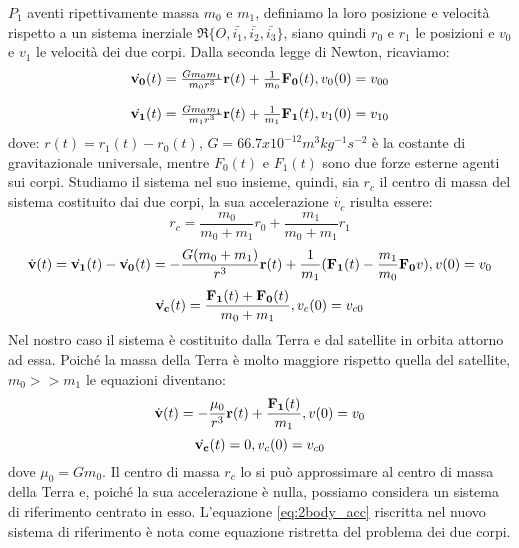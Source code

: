 $P_1$ aventi ripettivamente massa $m_0$ e $m_1$, definiamo la loro posizione e
velocità rispetto a un sistema inerziale $\mathfrak{R} \{
O,\bar{i_1},\bar{i_2},\bar{i_3}\}$, siano quindi $r_0$ e $r_1$ le posizioni e
$v_0$ e $v_1$ le velocità dei due corpi. Dalla seconda legge di Newton,
ricaviamo:
\begin{equation}
\begin{array}{l}
\dot{\bf v_0}(t)=\frac{Gm_0m_1}{m_0r^3}{\bf r}(t) +
\frac{1}{m_0}{\bf F_0}(t),v_0(0)=v_{00}\\\\
\dot{\bf v_1}(t)=\frac{Gm_0m_1}{m_1r^3}{\bf r}(t) +
\frac{1}{m_1}{\bf F_1}(t),v_1(0)=v_{10}
\end{array}
\end{equation}
dove: $r(t)=r_1(t)-r_0(t)$, $G=66.7x10^{-12} m^3kg^{-1}s^{-2}$ è la costante di
gravitazionale universale, mentre $F_0(t)$ e $F_1(t)$ sono due forze esterne
agenti sui corpi.
Studiamo il sistema nel suo insieme, quindi, sia $r_c$ il centro di massa del
sistema costituito dai due corpi, la sua accelerazione $\dot{v_c}$ risulta essere:
\[r_c=\frac{m_0}{m_0+m_1}r_0+\frac{m_1}{m_0+m_1}r_1\]
\begin{equation}
\dot{\bf v}(t)=\dot{\bf v_1}(t)-\dot{\bf v_0}(t)=-\frac{G(m_0+m_1)}{r^3}{\bf
r}(t)+\frac{1}{m_1}({\bf F_1}(t)-\frac{m_1}{m_0}{\bf F_0}v), v(0)=v_0
\end{equation}
\begin{equation}
\dot{\bf v_c}(t)=\frac{{\bf F_1}(t)+{\bf F_0}(t)}{m_0+m_1},v_c(0)=v_{c0}
\end{equation}
Nel nostro caso il sistema è costituito dalla Terra e dal satellite in orbita
attorno ad essa. Poiché la massa della Terra è molto maggiore rispetto quella
del satellite, $m_0>>m_1$ le equazioni diventano:
\begin{equation}
\dot{\bf v}(t)=-\frac{\mu_0}{r^3}{\bf r}(t)+\frac{{\bf F_1}(t)}{m_1}, v(0)=v_0
\label{eq:2body_acc}
\end{equation}
\begin{equation}
\dot{\bf v_c}(t)=0, v_c(0)=v_{c0}
\end{equation}
dove $\mu_0=Gm_0$.
Il centro di massa $r_c$ lo si può approssimare al centro di massa della Terra
e, poiché la sua accelerazione è nulla, possiamo considera un sistema di
riferimento centrato in esso. L'equazione \ref{eq:2body_acc} riscritta
nel nuovo sistema di riferimento è nota come equazione ristretta del problema
dei due corpi.
